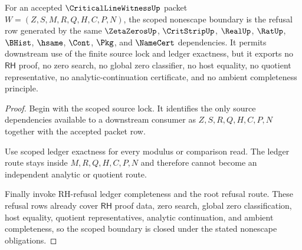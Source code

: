 \begin{theorem}
\label{thm:critical-line-witness-scoped-nonescape-boundary}
For an accepted $\CriticalLineWitnessUp$ packet $W=(Z,S,M,R,Q,H,C,P,N)$, the scoped nonescape boundary is the refusal row generated by the same $\ZetaZerosUp$, $\CritStripUp$, $\RealUp$, $\RatUp$, $\BHist$, $\hsame$, $\Cont$, $\Pkg$, and $\NameCert$ dependencies. It permits downstream use of the finite source lock and ledger exactness, but it exports no $\mathsf{RH}$ proof, no zero search, no global zero classifier, no host equality, no quotient representative, no analytic-continuation certificate, and no ambient completeness principle.
\end{theorem}
\begin{proof}
Begin with the scoped source lock. It identifies the only source dependencies available to a downstream consumer as $Z,S,R,Q,H,C,P,N$ together with the accepted packet row.

Use scoped ledger exactness for every modulus or comparison read. The ledger route stays inside $M,R,Q,H,C,P,N$ and therefore cannot become an independent analytic or quotient route.

Finally invoke RH-refusal ledger completeness and the root refusal route. These refusal rows already cover $\mathsf{RH}$ proof data, zero search, global zero classification, host equality, quotient representatives, analytic continuation, and ambient completeness, so the scoped boundary is closed under the stated nonescape obligations.
\end{proof}
